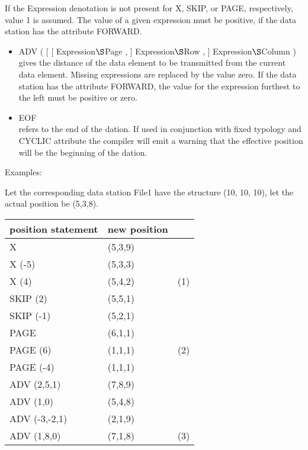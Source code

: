 If the Expression denotation is not present for X, SKIP, or PAGE, respectively,
value 1 is assumed. The value of a given expression must be positive, if
the data station has the attribute FORWARD.
\begin{itemize}
\item ADV ( [ [ Expression$\S $Page , ] Expression$\S $Row , ] Expression$\S $Column )\\
gives the distance of the data element to be transmitted from the
current data element. Missing expressions are replaced by the value
zero. If the data station has the attribute FORWARD, the value for the
expression furthest to the left must be positive or zero.
\item EOF\\
refers to the end of the dation. If used in conjunction with fixed typology
and CYCLIC attribute the
compiler will emit a warning that the effective position will be the
beginning of the dation.
\end{itemize}

Examples:

Let the corresponding data station File1 have the structure (10, 10,
10), let the actual position be (5,3,8).

\begin{tabular}{l@{\x}l@{\x}l}
position statement   & new position &     \\ \hline
X                    & (5,3,9)      &     \\
X (-5)               & (5,3,3)      &     \\
X (4)                & (5,4,2)      & (1) \\
SKIP (2)             & (5,5,1)      &     \\
SKIP (-1)            & (5,2,1)      &     \\
PAGE                 & (6,1,1)      &     \\
PAGE (6)             & (1,1,1)      & (2) \\
PAGE (-4)            & (1,1,1)      &     \\
ADV (2,5,1)          & (7,8,9)      &     \\
ADV (1,0)            & (5,4,8)      &     \\
ADV (-3,-2,1)        & (2,1,9)      &     \\
ADV (1,8,0)          & (7,1,8)      & (3)
\end{tabular}

